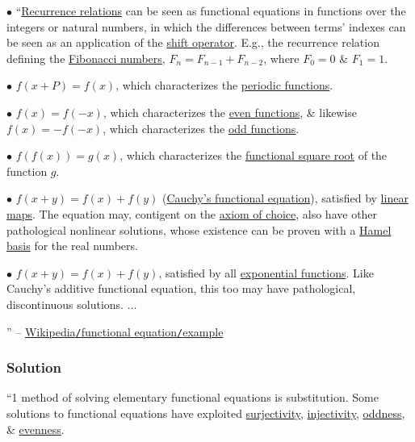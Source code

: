 \documentclass{article}
\numberwithin{equation}{section}
\begin{document}
\begin{enumerate*}
	\item[$\bullet$] ``\href{https://en.wikipedia.org/wiki/Recurrence_relation}{Recurrence relations} can be seen as functional equations in functions over the integers or natural numbers, in which the differences between terms' indexes can be seen as an application of the \href{https://en.wikipedia.org/wiki/Shift_operator}{shift operator}. E.g., the recurrence relation defining the \href{https://en.wikipedia.org/wiki/Fibonacci_numbers}{Fibonacci numbers}, $F_n = F_{n-1} + F_{n-2}$, where $F_0 = 0$ \& $F_1 = 1$.
	\item[$\bullet$] $f(x + P) = f(x)$, which characterizes the \href{https://en.wikipedia.org/wiki/Periodic_function}{periodic functions}.
	\item[$\bullet$] $f(x) = f(-x)$, which characterizes the \href{https://en.wikipedia.org/wiki/Even_function}{even functions}, \& likewise $f(x) = -f(-x)$, which characterizes the \href{https://en.wikipedia.org/wiki/Odd_function}{odd functions}.
	\item[$\bullet$] $f(f(x)) = g(x)$, which characterizes the \href{https://en.wikipedia.org/wiki/Functional_square_root}{functional square root} of the function $g$.
	\item[$\bullet$] $f(x + y) = f(x) + f(y)$ (\href{https://en.wikipedia.org/wiki/Cauchy%27s_functional_equation}{Cauchy's functional equation}), satisfied by \href{https://en.wikipedia.org/wiki/Linear_map}{linear maps}. The equation may, contigent on the \href{https://en.wikipedia.org/wiki/Axiom_of_choice}{axiom of choice}, also have other pathological nonlinear solutions, whose existence can be proven with a \href{https://en.wikipedia.org/wiki/Hamel_basis}{Hamel basis} for the real numbers.
	\item[$\bullet$] $f(x + y) = f(x) + f(y)$, satisfied by all \href{https://en.wikipedia.org/wiki/Exponential_function}{exponential functions}. Like Cauchy's additive functional equation, this too may have pathological, discontinuous solutions. $\ldots$
\end{enumerate*}
'' -- \href{https://en.wikipedia.org/wiki/Functional_equation#Examples}{Wikipedia\texttt{/}functional equation\texttt{/}example}

\subsubsection{Solution}
``1 method of solving elementary functional equations is substitution. Some solutions to functional equations have exploited \href{https://en.wikipedia.org/wiki/Surjective}{surjectivity}, \href{https://en.wikipedia.org/wiki/Injective_function}{injectivity}, \href{https://en.wikipedia.org/wiki/Odd_function}{oddness}, \& \href{https://en.wikipedia.org/wiki/Even_function}{evenness}.
\end{document}
